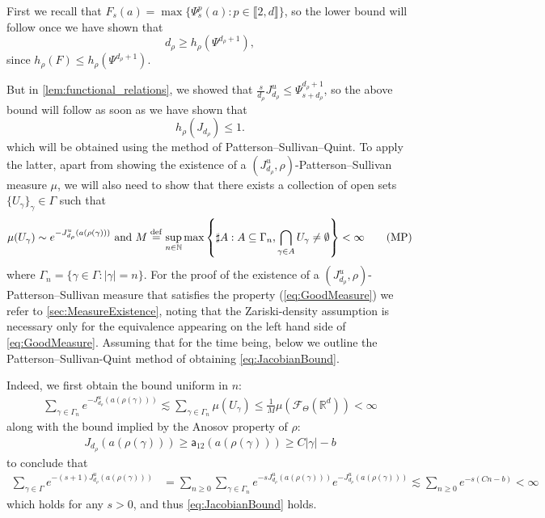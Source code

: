 \documentclass{report}
\begin{document}
First we recall that $F_s(a) = \max \{ \Psi_s^p(a) : p \in \llbracket 2, d \rrbracket\}$,
so the lower bound will follow once we have shown that
$$d_\rho \geq h_\rho(\Psi^{d_\rho + 1}),$$
since $h_\rho(F) \leq h_\rho(\Psi^{d_\rho + 1})$.

But in \cref{lem:functional_relations}, we showed that $\frac{s}{d_\rho} J_{d_\rho}^u \leq \Psi_{s+d_\rho}^{d_\rho + 1}$, so the above bound will follow as soon as we have shown that
\begin{equation}\label{eq:JacobianBound}
    h_\rho(J_{d_\rho}) \leq 1.\tag{LB}
\end{equation}
which will be obtained using the method of Patterson--Sullivan--Quint.
To apply the latter, apart from showing the existence of a $(J_{d_\rho}^u, \rho)$-Patterson--Sullivan measure $\mu$, we will also need to show that there exists a collection of open sets $\{U_\gamma\}_\gamma \in \Gamma$ such that
\begin{align*}\label{eq:GoodMeasure}
    \mu(U_\gamma) \sim e^{-J_{d_\rho}^u(a(\rho(\gamma)))} \text{ and } 
    M \overset{\mathrm{def}}{=} \sup_{n \in \mathbb N}
    \max
    \left\{\sharp A : A \subseteq \Gamma_n,  \bigcap_{\gamma \in A}U_\gamma \neq \emptyset \right\} < \infty\tag{MP}
\end{align*}
where $\Gamma_n = \{ \gamma \in \Gamma : |\gamma| = n \} $.
For the proof of the existence of a $(J_{d_\rho}^u, \rho)$-Patterson--Sullivan measure that satisfies the property (\ref{eq:GoodMeasure}) we refer to \cref{sec:MeasureExistence}, noting that the Zariski-density assumption is necessary only for the equivalence appearing on the left hand side of \cref{eq:GoodMeasure}.
Assuming that for the time being, below we outline the Patterson--Sullivan-Quint method of obtaining \cref{eq:JacobianBound}.

Indeed, we first obtain the bound uniform in $n$:
\begin{align*}
    \sum_{\gamma \in \Gamma_n}
    e^{-J_{d_\rho}^u(a(\rho(\gamma)))} \lesssim
    \sum_{\gamma \in \Gamma_n}
    \mu(U_\gamma) \leq \frac{1}{M} \mu(\mathcal F_\Theta(\mathbb R^d)) < \infty
\end{align*}
along with the bound implied by the Anosov property of $\rho$:
\begin{align*}
J_{d_\rho}(a(\rho(\gamma))) \geq \mathsf a_{12} (a(\rho(\gamma))) \geq C|\gamma| - b
\end{align*}
to conclude that
\begin{align*}
\sum_{\gamma \in \Gamma} e^{-(s+1)J^u_{d_\rho}(a(\rho(\gamma)))} &=
\sum_{n\geq 0} \sum_{\gamma \in \Gamma_n} e^{-s J^u_{d_\rho}(a(\rho(\gamma)))}
    e^{-J^u_{d_\rho}(a(\rho(\gamma)))} \lesssim
\sum_{n\geq 0} e^{-s(Cn - b)} < \infty
\end{align*}
which holds for any $s>0$, and thus \cref{eq:JacobianBound} holds.
\end{document}
